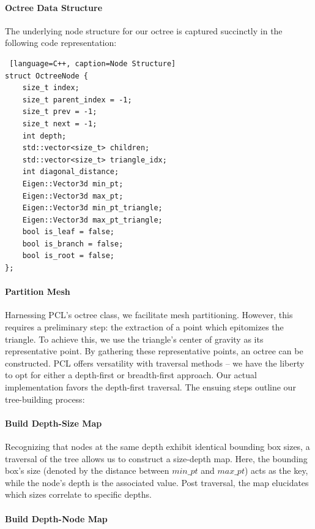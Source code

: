 \documentclass[11pt, a4paper,oneside,chapterprefix=false]{scrbook}
\begin{document}
\paragraph{Octree Data Structure}

The underlying node structure for our octree is captured succinctly in the following code representation:

\begin{lstlisting} [language=C++, caption=Node Structure]
struct OctreeNode {
    size_t index;
    size_t parent_index = -1;
    size_t prev = -1;
    size_t next = -1;
    int depth;
    std::vector<size_t> children;
    std::vector<size_t> triangle_idx;
    int diagonal_distance;
    Eigen::Vector3d min_pt;
    Eigen::Vector3d max_pt;
    Eigen::Vector3d min_pt_triangle;
    Eigen::Vector3d max_pt_triangle;
    bool is_leaf = false;
    bool is_branch = false;
    bool is_root = false;
};
\end{lstlisting}

\paragraph{Partition Mesh} \label{subsec:mesh octree}

Harnessing PCL's octree class, we facilitate mesh partitioning. However, this requires a preliminary step: the extraction of a point which epitomizes the triangle. To achieve this, we use the triangle's center of gravity as its representative point. By gathering these representative points, an octree can be constructed. PCL offers versatility with traversal methods – we have the liberty to opt for either a depth-first or breadth-first approach. Our actual implementation favors the depth-first traversal. The ensuing steps outline our tree-building process:

\paragraph{Build Depth-Size Map}

Recognizing that nodes at the same depth exhibit identical bounding box sizes, a traversal of the tree allows us to construct a size-depth map. Here, the bounding box's size (denoted by the distance between \( min\_pt \) and \( max\_pt \)) acts as the key, while the node's depth is the associated value. Post traversal, the map elucidates which sizes correlate to specific depths.

\paragraph{Build Depth-Node Map}
\end{document}
